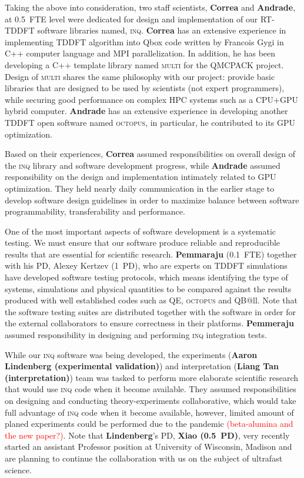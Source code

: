 Taking the above into consideration, two staff scientists, {\bf Correa} and {\bf Andrade}, at 0.5~FTE level were dedicated for design and implementation of our RT-TDDFT software libraries named, \textsc{inq}. 
{\bf Correa} has an extensive experience in implementing TDDFT algorithm into Qbox code written by Francois Gygi in C++ computer language and MPI parallelization. 
In addition, he has been developing a C++ template library named \textsc{multi} for the QMCPACK project.
Design of \textsc{multi} shares the same philosophy with our project: provide basic libraries that are designed to be used by scientists (not expert programmers), while securing good performance on complex HPC systems such as a CPU+GPU hybrid computer. 
{\bf Andrade} has an extensive experience in developing another TDDFT open software named \textsc{octopus}, in particular, he contributed to its GPU optimization.  

Based on their experiences, {\bf Correa} assumed responsibilities on overall design of the \textsc{inq} library and software development progress, while {\bf Andrade} assumed responsibility on the design and implementation intimately related to GPU optimization. 
They held nearly daily communication in the earlier stage to develop software design guidelines in order to maximize balance between software programmability, transferability and performance. 

One of the most important aspects of software development is a systematic testing. 
We must ensure that our software produce reliable and reproducible results that are essential for scientific research. 
{\bf Pemmaraju} (0.1~FTE) together with his PD, Alexey Kertzev (1~PD), who are experts on TDDFT simulations have developed software testing protocols, which means identifying the type of systems, simulations and physical quantities to be compared against the results produced with well established codes such as QE, 
\textsc{octopus} and QB@ll. 
Note that the software testing suites are distributed together with the software in order for the external collaborators to ensure correctness in their platforms.
{\bf Pemmeraju} assumed responsibility in designing and performing \textsc{inq} integration tests.

While our \textsc{inq} software was being developed, the experiments ({\bf Aaron Lindenberg (experimental validation)}) and interpretation ({\bf Liang Tan (interpretation)}) team was tasked to perform more elaborate scientific research that would use \textsc{inq} code when it become available. 
They assumed responsibilities on designing and conducting theory-experiments collaborative, which would take full advantage of \textsc{inq} code when it become available, however, limited amount of planed experiments could be performed due to the pandemic \textcolor{red}{(beta-alumina and the new paper?)}. 
Note that {\bf Lindenberg}'s PD, {\bf Xiao (0.5~PD)}, very recently started an assistant Professor position at University of Wisconsin, Madison and are planning to continue the collaboration with us on the subject of ultrafast science.

